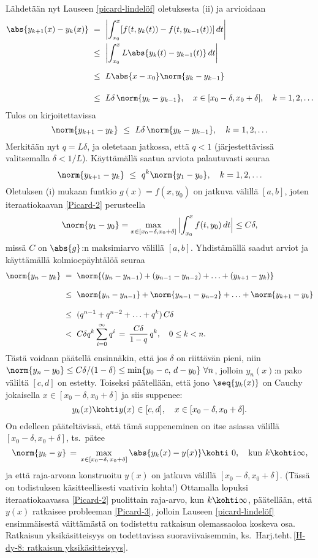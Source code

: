 Lähdetään nyt Lauseen \ref{picard-lindelöf} oletuksesta (ii) ja arvioidaan
\begin{align*}
\abs{y_{k+1}(x)-y_k(x)}\ 
     &=\ \left| \int_{x_0}^x [f(t,y_k(t))-f(t,y_{k-1}(t))]\,dt \right| \\ 
     &\le\ \left| \int_{x_0}^x L \abs{y_k(t)-y_{k-1}(t)}\,dt \right| \\[2mm]
     &\le\ L \abs{x-x_0} \norm{y_k-y_{k-1}} \\[4mm]
     &\le\ L\delta\,\norm{y_k-y_{k-1}}, \quad x \in [x_0-\delta,x_0+\delta], \quad k=1,2, \ldots
\end{align*}  
Tulos on kirjoitettavissa
\[
\norm{y_{k+1}-y_k}\ \le\ L\delta\,\norm{y_k-y_{k-1}}, \quad k=1,2,\ldots
\]
Merkitään nyt $q=L\delta$, ja oletetaan jatkossa, että $q < 1$ (järjestettävissä valitsemalla
$\delta<1/L$). Käyttämällä saatua arviota palautuvasti seuraa
\[
\norm{y_{k+1}-y_k}\ \le\ q^k\norm{y_1-y_0}, \quad k=1,2,\ldots
\]
Oletuksen (i) mukaan funtkio $g(x)=f(x,y_0)$ on jatkuva välillä $[a,b]$, joten iteraatiokaavan
\eqref{Picard-2} perusteella
\[
\norm{y_1-y_0} = \max_{x\in[x_0-\delta,x_0+\delta]}\,\Bigl|\int_{x_0}^x f(t,y_0)\,dt\Bigr| 
                 \le C\delta,
\]
missä $C$ on $\abs{g}$:n maksimiarvo välillä $[a,b]$. Yhdistämällä saadut arviot ja käyttämällä
kolmioepäyhtälöä seuraa
\begin{align*}
\norm{y_n-y_k}\ &=\ \norm{(y_n-y_{n-1})+(y_{n-1}-y_{n-2})+ \ldots + (y_{k+1}-y_k)} \\[3mm]
                &\le\ \norm{y_n-y_{n-1}}+ \norm{y_{n-1}-y_{n-2}} + \ldots 
                                                                 + \norm{y_{k+1}-y_k} \\[3mm]
                &\le\ (q^{n-1}+q^{n-2} + \ldots + q^k)\,C\delta \\
                &<\ C\delta q^k\sum_{i=0}^\infty q^i\,
                 =\,\frac{C\delta}{1-q}\,q^k, \quad 0 \le k < n.
\end{align*}
Tästä voidaan päätellä ensinnäkin, että jos $\delta$ on riittävän pieni, niin
$\norm{y_n-y_0} \le C\delta/(1-\delta) \le \min\{y_0-c,\,d-y_0\}\ \forall n$, jolloin
$y_n(x)$:n pako väliltä $[c,d]$ on estetty. Toiseksi päätellään, että jono $\seq{y_k(x)}$ on
Cauchy jokaisella $x \in [x_0-\delta,x_0+\delta]$ ja siis suppenee:
\[ 
y_k(x) \kohti y(x)\in[c,d], \quad x \in [x_0-\delta,x_0+\delta]. 
\]
%
On edelleen pääteltävissä, että tämä suppeneminen on itse asiassa  välillä
$[x_0-\delta,x_0+\delta]$, ts.\ pätee
\[
\norm{y_k-y}\,=\,\max_{x\in[x_0-\delta,\,x_0+\delta]} \abs{y_k(x)-y(x)} 
                 \kohti\ 0, \quad \text{kun}\ k \kohti \infty,
\]
ja että raja-arvona konstruoitu $y(x)$ on jatkuva välillä $[x_0-\delta,x_0+\delta]$. (Tässä on
todistuksen käsitteellisesti vaativin kohta!) Ottamalla lopuksi iteraatiokaavassa 
\eqref{Picard-2} puolittain raja-arvo, kun $k\kohti\infty$, päätellään, että $y(x)$ ratkaisee 
probleeman \eqref{Picard-3}, jolloin Lauseen \ref{picard-lindelöf} ensimmäisestä väittämästä
on todistettu ratkaisun olemassaoloa koskeva osa. Ratkaisun yksikäsitteisyys on todettavissa
suoraviivaisemmin, ks.\ Harj.teht.\,\ref{H-dy-8: ratkaisun yksikäsitteisyys}. 

